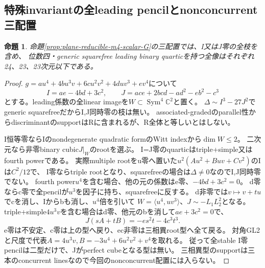 \documentclass[a4paper,11pt]{ltjsarticle}
\newtheorem{proposition}{命題}[section]
\theoremstyle{definition}
\begin{document}
\subsection{特殊invariantの全leading pencilとnonconcurrent三配置}
\begin{proposition}\label{prop:plane-reducible-m4-all-squarefree-G}
命題\ref{prop:plane-reducible-m4-scalar-G}の三配置では、I又はJ零の全枝を含め、
位数四・generic squarefree leading binary quarticを持つ全像はそれぞれ24、23、23次元以下である。
\end{proposition}
\begin{proof}
$g=au^4+4bu^3v+6cu^2v^2+4duv^3+ev^4$について
\[
 I=ae-4bd+3c^2,\qquad J=ace+2bcd-ad^2-eb^2-c^3
\]
とする。leading係数の全linear imageを$W\subset\operatorname{Sym}^4\mathbb C^2$と置く。
$\Delta\sim I^3-27J^2$でgeneric squarefreeだからI,J同時零の枝は無い。
associated-gradedのparallel性からdiscriminantのsupportはRに含まれるが、R全体と等しいとはしない。

I恒等零ならIのnondegenerate quadratic formのWitt indexから$\dim W\le2$。
二次元なら非零binary cubic$J|_W$のrootを選ぶ。
I=J零のquarticはtriple+simple又はfourth powerである。
実際multiple rootをu零へ置いた$u^2(Au^2+Buv+Cv^2)$のIは$C^2/12$で、
I零ならtriple rootとなり、squarefreeの場合は$\Delta\ne0$なのでI,J同時零でない。
fourth power$u^4$を含む場合、他の元の係数はe零、$-4bd+3c^2=0$。
d零ならc零で全pencilが$u^3$を因子に持ち、squarefreeに反する。
d非零では$v\mapsto v+tu$でcを消し、Iからbも消し、$u^4$倍を引いて
$W=\langle u^4,uv^3\rangle$、$J\sim-L_1L_2^2$となる。
triple+simple$4u^3v$を含む場合はd零、他元のbを消して$ae+3c^2=0$で、
\[
 J(sA+tB)=-es^2t-4c^3t^3.
\]
e零は不安定、c零は上の型へ戻り、ec非零は三相異root型へ全て戻る。
対角GL2と尺度で代表$A=4u^3v,B=-3u^4+6u^2v^2+v^4$を取れる。
従って全stable I零pencilは二型だけで、Jがperfect cubeとなる型は無い。
三相異型のsupportは三本のconcurrent linesなので今回のnonconcurrent配置には入らない。


\end{proof}
\end{document}
